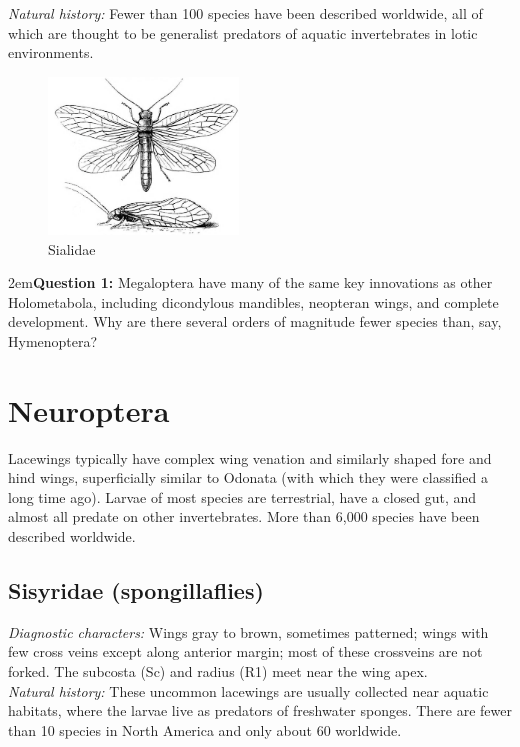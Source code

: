 \documentclass[letterpaper, 11pt]{article}
\begin{document}
\noindent{}\textit{Natural history:} Fewer than 100 species have been described worldwide, all of which are thought to be generalist predators of aquatic invertebrates in lotic environments.\\

\begin{figure}[ht!]
  \centering
    \includegraphics[width=0.45\textwidth]{figures/sialidae.png}
  \caption{Sialidae \citep[modified from Fig. 286 in][]{bhlitem56570}}
  \label{fig:sialid1}
\end{figure}

\hangindent2em\textbf{Question 1:}  Megaloptera have many of the same key innovations as other Holometabola, including dicondylous mandibles, neopteran wings, and complete development. Why are there several orders of magnitude fewer species than, say, Hymenoptera?

\section{Neuroptera}
Lacewings typically have complex wing venation and similarly shaped fore and hind wings, superficially similar to Odonata (with which they were classified a long time ago). Larvae of most species are terrestrial, have a closed gut, and almost all predate on other invertebrates. More than 6,000 species have been described worldwide.\\

\subsection{Sisyridae (spongillaflies)}
\noindent{}\textit{Diagnostic characters:} Wings gray to brown, sometimes patterned; wings with few cross veins except along anterior margin; most of these crossveins are not forked. The subcosta (Sc) and radius (R1) meet near the wing apex.\\

\noindent{}\textit{Natural history:} These uncommon lacewings are usually collected near aquatic habitats, where the larvae live as predators of freshwater sponges. There are fewer than 10 species in North America and only about 60 worldwide.\\
\end{document}
